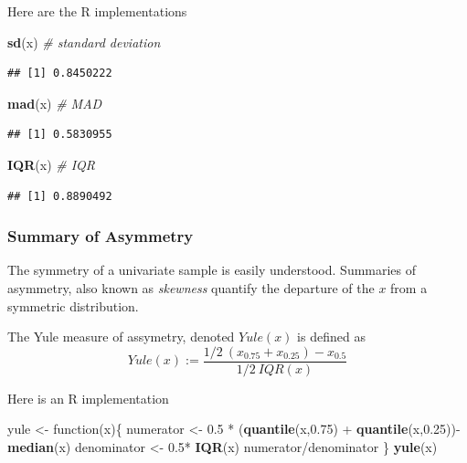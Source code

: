 \documentclass[]{book}
\newenvironment{Shaded}{\begin{snugshade}}{\end{snugshade}}
\newcommand{\KeywordTok}[1]{\textcolor[rgb]{0.13,0.29,0.53}{\textbf{{#1}}}}
\newcommand{\FloatTok}[1]{\textcolor[rgb]{0.00,0.00,0.81}{{#1}}}
\newcommand{\StringTok}[1]{\textcolor[rgb]{0.31,0.60,0.02}{{#1}}}
\newcommand{\CommentTok}[1]{\textcolor[rgb]{0.56,0.35,0.01}{\textit{{#1}}}}
\newcommand{\NormalTok}[1]{{#1}}
\theoremstyle{definition}
\theoremstyle{definition}
\theoremstyle{remark}
\let\BeginKnitrBlock\begin \let\EndKnitrBlock\end
\begin{document}
Here are the R implementations

\begin{Shaded}
\begin{Highlighting}[]
\KeywordTok{sd}\NormalTok{(x) }\CommentTok{# standard deviation}
\end{Highlighting}
\end{Shaded}

\begin{verbatim}
## [1] 0.8450222
\end{verbatim}

\begin{Shaded}
\begin{Highlighting}[]
\KeywordTok{mad}\NormalTok{(x) }\CommentTok{# MAD}
\end{Highlighting}
\end{Shaded}

\begin{verbatim}
## [1] 0.5830955
\end{verbatim}

\begin{Shaded}
\begin{Highlighting}[]
\KeywordTok{IQR}\NormalTok{(x) }\CommentTok{# IQR}
\end{Highlighting}
\end{Shaded}

\begin{verbatim}
## [1] 0.8890492
\end{verbatim}

\subsubsection{Summary of Asymmetry}\label{summary-of-asymmetry}

The symmetry of a univariate sample is easily understood. Summaries of
asymmetry, also known as \emph{skewness} quantify the departure of the
\(x\) from a symmetric distribution.

\BeginKnitrBlock{definition}
\protect\hypertarget{def:unnamed-chunk-73}{}{\label{def:unnamed-chunk-73}}The
Yule measure of assymetry, denoted \(Yule(x)\) is defined as
\[Yule(x) := \frac{1/2 \: (x_{0.75}+x_{0.25}) - x_{0.5} }{1/2 \: IQR(x)} \]
\EndKnitrBlock{definition}

Here is an R implementation

\begin{Shaded}
\begin{Highlighting}[]
\NormalTok{yule <-}\StringTok{ }\NormalTok{function(x)\{}
  \NormalTok{numerator <-}\StringTok{ }\FloatTok{0.5} \NormalTok{*}\StringTok{ }\NormalTok{(}\KeywordTok{quantile}\NormalTok{(x,}\FloatTok{0.75}\NormalTok{) +}\StringTok{ }\KeywordTok{quantile}\NormalTok{(x,}\FloatTok{0.25}\NormalTok{))-}\KeywordTok{median}\NormalTok{(x) }
  \NormalTok{denominator <-}\StringTok{ }\FloatTok{0.5}\NormalTok{*}\StringTok{ }\KeywordTok{IQR}\NormalTok{(x)}
  \NormalTok{numerator/denominator}
\NormalTok{\}}
\KeywordTok{yule}\NormalTok{(x)}
\end{Highlighting}
\end{Shaded}
\end{document}
